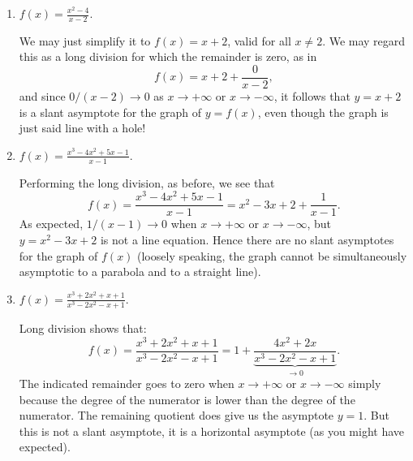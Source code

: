 \documentclass{ximera}
\begin{document}
\begin{example}
\begin{enumerate}
  \item $f(x) = \frac{x^2-4}{x-2}$. \\[1em]
    \begin{explanation}
      We may just simplify it to $f(x) = x+2$, valid for all $x \neq 2$. We may regard this as a long division for which the remainder is zero, as in $$  f(x) = x+2+\frac{0}{x-2},  $$and since $0/(x-2) \to 0$ as $x\to +\infty$ or $x\to -\infty$, it follows that $y=x+2$ is a slant asymptote for the graph of $y=f(x)$, even though the graph is just said line with a hole!
      \begin{image}
      \end{image}      
    \end{explanation}
  \item $f(x)=\frac{x^3-4x^2+5x-1}{x-1}$. \\[1em]
    \begin{explanation}
      Performing the long division, as before, we see that $$   f(x) = \frac{x^3-4x^2+5x-1}{x-1} = x^2-3x+2 + \frac{1}{x-1}.  $$As expected, $1/(x-1) \to 0$ when $x \to +\infty$ or $x\to -\infty$, but $y=x^2-3x+2$ is not a line equation. Hence there are no slant asymptotes for the graph of $f(x)$ (loosely speaking, the graph cannot be simultaneously asymptotic to a parabola and to a straight line).
      \begin{image}
      \end{image}
    \end{explanation}
  \item $f(x) = \frac{x^3+2x^2+x+1}{x^3-2x^2-x+1}$. \\[1em]
   \begin{explanation}
      Long division shows that: $$   f(x) = \frac{x^3+2x^2+x+1}{x^3-2x^2-x+1} = 1 + \underbrace{\frac{4x^2+2x}{x^3-2x^2-x+1}}_{\to 0}.  $$The indicated remainder goes to zero when $x \to +\infty$ or $x\to -\infty$ simply because the degree of the numerator is lower than the degree of the numerator. The remaining quotient does give us the asymptote $y=1$. But this is not a slant asymptote, it is a horizontal asymptote (as you might have expected).

\end{explanation}
\end{enumerate}
\end{example}
\end{document}

